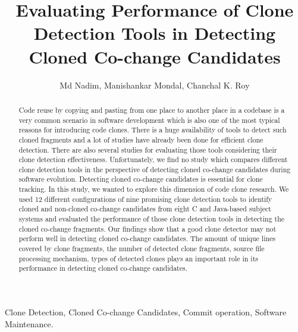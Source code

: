 \documentclass[review]{elsarticle}
\begin{document}
\begin{frontmatter}

\title{Evaluating Performance of Clone Detection Tools in Detecting Cloned Co-change Candidates}

\author{Md Nadim, Manishankar Mondal, Chanchal K. Roy}
\address{Department of Computer Science, University of Saskatchewan, Saskatoon, Canada}

\begin{abstract}
Code reuse by copying and pasting from one place to another place in a codebase is a very common scenario in software development which is also one of the most typical reasons for introducing code clones. There is a huge availability of tools to detect such cloned fragments and a lot of studies have already been done for efficient clone detection. There are also several studies for evaluating those tools considering their clone detection effectiveness. Unfortunately, we find no study which compares different clone detection tools in the perspective of detecting cloned co-change candidates during software evolution. Detecting cloned co-change candidates is essential for clone tracking. In this study, we wanted to explore this dimension of code clone research. We used 12 different configurations of nine promising clone detection tools to identify cloned and non-cloned co-change candidates from eight C and Java-based subject systems and evaluated the performance of those clone detection tools in detecting the cloned co-change fragments. Our findings show that a good clone detector may not perform well in detecting cloned co-change candidates. The amount of unique lines covered by clone fragments, the number of detected clone fragments, source file processing mechanism, types of detected clones plays an important role in its performance in detecting cloned co-change candidates. 
\end{abstract}

\begin{keyword}
Clone Detection, Cloned Co-change Candidates, Commit operation, Software Maintenance.
\end{keyword}

\end{frontmatter}
\end{document}

